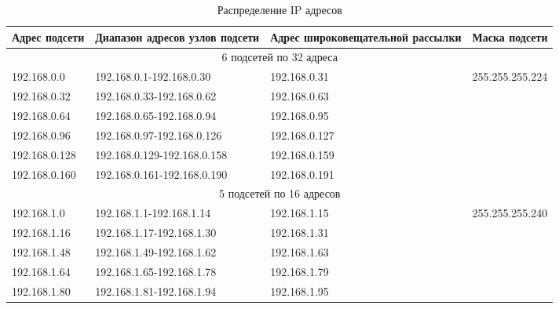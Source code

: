 \begin{table}[!htbp]
  \centering
  \begin{tabular}{|l|l|l|l|}
    \hline
    Адрес подсети & Диапазон адресов узлов подсети & Адрес широковещательной  рассылки & Маска подсети \\ \hline
    \multicolumn{4}{|c|}{6 подсетей по 32 адреса} \\ \hline
    192.168.0.0 & 192.168.0.1-192.168.0.30 & 192.168.0.31 & \multirow{6}{*}{255.255.255.224} \\ \cline{1-3}
    192.168.0.32 & 192.168.0.33-192.168.0.62 & 192.168.0.63  &  \\ \cline{1-3}
    192.168.0.64 & 192.168.0.65-192.168.0.94 & 192.168.0.95  &  \\ \cline{1-3}
    192.168.0.96 & 192.168.0.97-192.168.0.126 & 192.168.0.127 &  \\ \cline{1-3}
    192.168.0.128 & 192.168.0.129-192.168.0.158 & 192.168.0.159 &  \\ \cline{1-3}
    192.168.0.160 & 192.168.0.161-192.168.0.190 & 192.168.0.191 &  \\ \hline
    \multicolumn{4}{|c|}{5 подсетей по 16 адресов} \\ \hline
    192.168.1.0 & 192.168.1.1-192.168.1.14 & 192.168.1.15 & \multirow{5}{*}{255.255.255.240} \\ \cline{1-3}
    192.168.1.16 & 192.168.1.17-192.168.1.30 & 192.168.1.31 &  \\ \cline{1-3}
    192.168.1.48 & 192.168.1.49-192.168.1.62 & 192.168.1.63 &  \\ \cline{1-3}
    192.168.1.64 & 192.168.1.65-192.168.1.78 & 192.168.1.79 &  \\ \cline{1-3}
    192.168.1.80 & 192.168.1.81-192.168.1.94 & 192.168.1.95 &  \\ \hline
    
  \end{tabular}
  \caption{Распределение IP адресов}
  \label{table:ipfinal}
\end{table}

